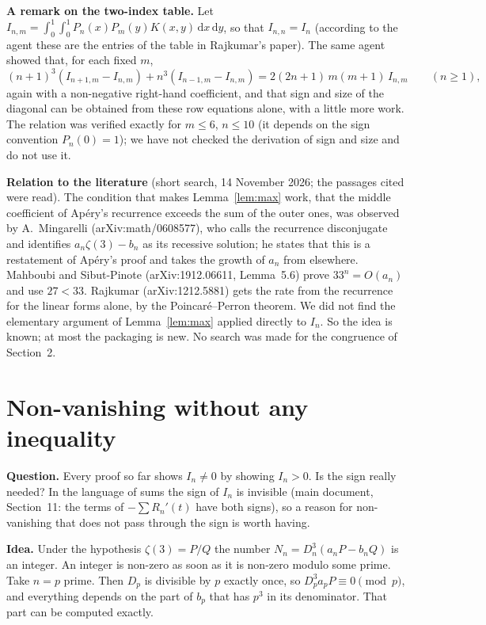 \documentclass[11pt]{article}
\newcommand{\dd}{\,\mathrm d}
\newcommand{\q}[1]{\medskip\noindent\textbf{#1}}
\begin{document}
\q{A remark on the two-index table.} Let
$I_{n,m}=\int_0^1\!\!\int_0^1P_n(x)P_m(y)K(x,y)\dd x\dd y$, so that $I_{n,n}=I_n$ (according to the
agent these are the entries of the table in Rajkumar's paper). The same agent showed that, for each
fixed $m$,
\[
(n+1)^3(I_{n+1,m}-I_{n,m})+n^3(I_{n-1,m}-I_{n,m})=2(2n+1)\,m(m+1)\,I_{n,m}\qquad(n\ge1),
\]
again with a non-negative right-hand coefficient, and that sign and size of the diagonal can be
obtained from these row equations alone, with a little more work. The relation was verified exactly
for $m\le6$, $n\le10$ (it depends on the sign convention $P_n(0)=1$); we have not checked the
derivation of sign and size and do not use it.

\q{Relation to the literature} (short search, 14 November 2026; the passages cited were read). The
condition that makes Lemma~\ref{lem:max} work, that the middle coefficient of Ap\'ery's recurrence
exceeds the sum of the outer ones, was observed by A.~Mingarelli (arXiv:math/0608577), who calls the
recurrence disconjugate and identifies $a_n\zeta(3)-b_n$ as its recessive solution; he states that
this is a restatement of Ap\'ery's proof and takes the growth of $a_n$ from elsewhere. Mahboubi and
Sibut-Pinote (arXiv:1912.06611, Lemma~5.6) prove $33^n=O(a_n)$ and use $27<33$. Rajkumar
(arXiv:1212.5881) gets the rate from the recurrence for the linear forms alone, by the
Poincar\'e--Perron theorem. We did not find the elementary argument of Lemma~\ref{lem:max} applied
directly to $I_n$. So the idea is known; at most the packaging is new. No search was made for the
congruence of Section~2.

\section{Non-vanishing without any inequality}

\q{Question.} Every proof so far shows $I_n\ne0$ by showing $I_n>0$. Is the sign really needed?
In the language of sums the sign of $I_n$ is invisible (main document, Section~11: the terms of
$-\sum R_n'(t)$ have both signs), so a reason for non-vanishing that does not pass through the sign
is worth having.

\q{Idea.} Under the hypothesis $\zeta(3)=P/Q$ the number $N_n=D_n^3(a_nP-b_nQ)$ is an integer. An
integer is non-zero as soon as it is non-zero modulo some prime. Take $n=p$ prime. Then $D_p$ is
divisible by $p$ exactly once, so $D_p^3a_pP\equiv0\pmod p$, and everything depends on the part of
$b_p$ that has $p^3$ in its denominator. That part can be computed exactly.
\end{document}
